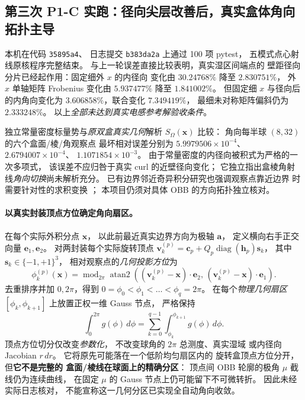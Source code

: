 \subsection{第三次 P1-C 实跑：径向尖层改善后，真实盒体角向拓扑主导}
\label{sec:p1-c-box-angular-projection}
本机在代码 \texttt{35895a4}、
日志提交 \texttt{b383da2a} 上通过 100 项 pytest，
五模式点心射线原核程序完整结束。
与上一轮误差直接比较表明，真实湿区间端点的
壁距径向分片已经起作用：固定细外 $x$ 的内径向
变化由 $30.24768\%$ 降至 $2.830751\%$，
外 $x$ 单轴矩阵 Frobenius 变化由
$5.937477\%$ 降至 $1.841002\%$。
但固定细 $x$ 与径向后的内角向变化为
$3.606858\%$，联合变化 $7.349419\%$，
最细未对称矩阵偏斜仍为 $2.333248\%$。
以上\emph{全部未达到真实电感参考解验收条件}。

独立常量密度标量势与\emph{原双盒真实几何}解析
$S_\Omega(\bm x)$ 比较：
角向每半球 $(8,32)$ 的六个盒面/棱/角观察点
最坏相对误差分别为
$5.9979506\times10^{-4}$、
$2.6794007\times10^{-4}$、
$1.1071854\times10^{-3}$。
由于常量密度的内径向被积式为严格的一次多项式，
该误差不应归咎于真实 curl 的近壁径向变化；
它独立指出盒棱角射线\emph{角向切换}尚未解析充分。
已有边界邻近奇异积分研究也强调观察点靠近边界
时需要针对性的求积变换
\cite{atkinsonchienhansen2020}；
本项目仍须对具体 OBB 的方向拓扑独立核对。

\paragraph{以真实封装顶点方位确定角向扇区。}
在每个实际外积分点 $\bm x$，
以此前最近真实边界方向为极轴 $\bm a$，
定义横向右手正交向量 $\bm e_1,\bm e_2$。
对两封装每个实际旋转顶点
$\bm v^{(p)}_k=\bm c_p+
Q_p\operatorname{diag}(\bm h_p)\bm s_k$，
其中 $\bm s_k\in\{-1,+1\}^3$，
相对观察点的\emph{几何投影方位}为
\begin{equation}
 \phi_k^{(p)}(\bm x)=
 \operatorname{mod}_{2\pi}\operatorname{atan2}\!
 \left((\bm v^{(p)}_k-\bm x)\cdot\bm e_2,\,
       (\bm v^{(p)}_k-\bm x)\cdot\bm e_1\right).
\end{equation}
去重排序并加 $0,2\pi$，得到
$0=\phi_0<\phi_1<\ldots<\phi_q=2\pi$。
在每个\emph{物理几何扇区}
$[\phi_k,\phi_{k+1}]$ 上放置正权一维 Gauss 节点，
严格保持
\begin{equation}
 \int_0^{2\pi}g(\phi)\,d\phi=
 \sum_{k=0}^{q-1}\int_{\phi_k}^{\phi_{k+1}}g(\phi)\,d\phi.
\end{equation}
顶点方位切分仅改变\emph{参数化}，
不改变球角的 $2\pi$ 总测度、真实湿域
或内径向 Jacobian $r\,dr$。
它将原先可能落在一个低阶均匀扇区内的
旋转盒顶点方位分开，但\textbf{它不是完整的
盒面/棱线在球面上的精确分区}：
顶点间 OBB 轮廓的极角 $\mu$ 截线仍为连续曲线，
在固定 $\mu$ 的 Gauss 节点上仍可能留下不可微转折。
因此未经实际日志核对，
不能宣称这一几何分区已实现全自动角向收敛。

